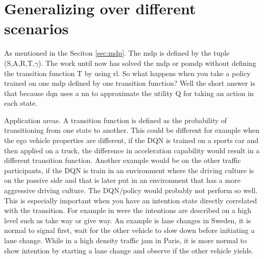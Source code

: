 \chapter{Generalizing over different scenarios} \label{ch:generalize}

As mentioned in the Seciton \ref{sec:mdp}. The \gls{mdp} is defined by the tuple (S,A,R,T,$\gamma$). The work until now has solved the \gls{mdp} or \gls{pomdp} without defining the transition function T by using \gls{rl}. So what happens when you take a policy trained on one \gls{mdp} defined by one transition function? Well the short answer is that because \gls{dqn} uses a \gls{nn} to approximate the utility Q for taking an action in each state. 

Application areas. A transition function is defined as the probability of transitioning from one state to another. This could be different for example when the ego vehicle properties are different, if the DQN is trained on a sports car and then applied on a truck, the difference in acceleration capability would result in a different transition function. Another example would be on the other traffic participants, if the DQN is train in an environment where the driving culture is on the passive side and that is later put in an environment that has a more aggressive driving culture. The DQN/policy would probably not perform so well. 
This is especially important when you have an intention state directly correlated with the transition. For example in \paperD were the intentions are described on a high level such as take way or give way. 
An example is lane changes in Sweden, it is normal to signal first, wait for the other vehicle to slow down before initiating a lane change. While in a high density traffic jam in Paris, it is more normal to show intention by starting a lane change and observe if the other vehicle yields. 

